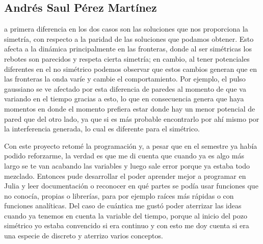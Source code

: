

\subsection{Andrés Saul Pérez Martínez }
a primera diferencia en los dos casos son las soluciones que nos proporciona la simetría, con respecto a la paridad de las soluciones que podamos obtener. Esto afecta a la dinámica principalmente en las fronteras, donde al ser simétricas los rebotes son parecidos y respeta cierta simetría; en cambio, al tener potenciales diferentes en el no simétrico podemos observar que estos cambios generan que en las fronteras la onda varíe y cambie el comportamiento. Por ejemplo, el pulso gaussiano se ve afectado por esta diferencia de paredes al momento de que va variando en el tiempo gracias a esto, lo que en consecuencia genera que haya momentos en donde el momento prefiera estar donde hay un menor potencial de pared que del otro lado, ya que si es más probable encontrarlo por ahí mismo por la interferencia generada, lo cual es diferente para el simétrico.

Con este proyecto retomé la programación y, a pesar que en el semestre ya había podido reforzarme, la verdad es que me di cuenta que cuando ya es algo más largo se te van acabando las variables y luego sale error porque ya estaba todo mezclado. Entonces pude desarrollar el poder aprender mejor a programar en Julia y leer documentación o reconocer en qué partes se podía usar funciones que no conocía, propias o librerías, para por ejemplo raíces más rápidas o con funciones analíticas. Del caso de cuántica me gustó poder aterrizar las ideas cuando ya tenemos en cuenta la variable del tiempo, porque al inicio del pozo simétrico yo estaba convencido si era continuo y con esto me doy cuenta si era una especie de discreto y aterrizo varios conceptos.